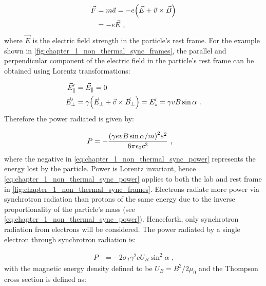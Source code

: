 \begin{equation}
	\begin{split}
		\vec{F}&=m\vec{a}=-e\qty(\vec{E}+\vec{v}\times \vec{B})  \\
		&=-e\vec{E}\text{ ,}
	\end{split}
\end{equation}
where $\vec{E}$ is the electric field strength in the particle's rest frame. For the example shown in \autoref{fig:chapter_1_non_thermal_sync_frames}, the parallel and perpendicular component of the electric field in the particle's rest frame can be obtained using Lorentz transformations:

\begin{subequations}
	\begin{align}
		\vec{E}_\parallel'&=\vec{E}_\parallel=0 \\
		\vec{E}_\perp'&=\gamma\qty(\vec{E}_\perp +\vec{v}\times \vec{B}_\perp) = E_z' = \gamma vB\sin\alpha\text{ .}
	\end{align}
\end{subequations}
\noindent Therefore the power radiated is given by:

\begin{equation}
    \begin{aligned}
	P&=-\frac{\qty(\gamma evB\sin\alpha/m)^2e^2}{6\pi\epsilon_0c^3}\text{ ,}
    \end{aligned} \label{eq:chapter_1_non_thermal_sync_power}
\end{equation}
\noindent where the negative in \autoref{eq:chapter_1_non_thermal_sync_power} represents the energy lost by the particle. Power is Lorentz invariant, hence \autoref{eq:chapter_1_non_thermal_sync_power} applies to both the lab and rest frame in \autoref{fig:chapter_1_non_thermal_sync_frames}. Electrons radiate more power via synchrotron radiation than protons of the same energy due to the inverse proportionality of the particle's mass (see \autoref{eq:chapter_1_non_thermal_sync_power}). Henceforth, only synchrotron radiation from electrons will be considered. The power radiated by a single electron through synchrotron radiation is:

\begin{equation}
    \begin{aligned}
    P&=-2\sigma_T\gamma^2c U_B\sin^2\alpha\text{ ,}
    \end{aligned}
\end{equation}
\noindent with the magnetic energy density defined to be $U_B=B^2/2\mu_0$ and the Thompson cross section is defined as:

